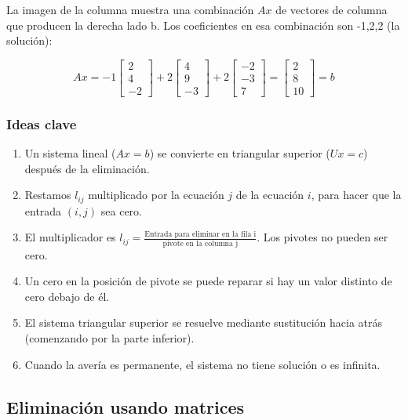 La imagen de la columna muestra una combinación $Ax$ de vectores de columna que producen la derecha
lado b. Los coeficientes en esa combinación son -1,2,2 (la solución):

\begin{equation*}
	Ax= -1\begin{bmatrix}
		2 \\4\\-2
	\end{bmatrix}+2 \begin{bmatrix}
		4 \\9\\-3
	\end{bmatrix}+2 \begin{bmatrix}
		-2 \\-3\\7
	\end{bmatrix}= \begin{bmatrix}
		2 \\8\\10
	\end{bmatrix}=b
\end{equation*}

\subsubsection{Ideas clave}

\begin{enumerate}
	\item Un sistema lineal ($Ax = b$) se convierte en triangular superior ($Ux = c$) después de la eliminación.
	\item Restamos $l_{ij}$ multiplicado por la ecuación $j$ de la ecuación $i$, para hacer que la entrada $(i, j)$ sea cero.
	\item El multiplicador es $l_{ij}=\frac{\text{Entrada para eliminar en la fila i}}{\text{pivote en la columna j}}$. Los pivotes no pueden ser cero.
	\item Un cero en la posición de pivote se puede reparar si hay un valor distinto de cero debajo de él.
	\item El sistema triangular superior se resuelve mediante sustitución hacia atrás (comenzando por la parte inferior).
	\item Cuando la avería es permanente, el sistema no tiene solución o es infinita.
\end{enumerate}

\subsection{Eliminación usando matrices}

